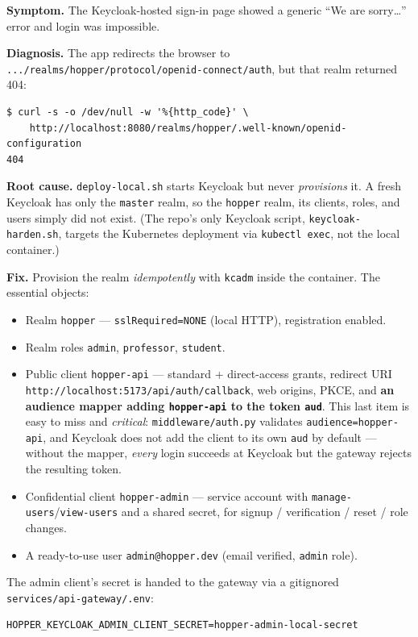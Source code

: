 \documentclass[11pt,a4paper]{article}
\newcommand{\code}[1]{\texttt{\small #1}}
\begin{document}
\textbf{Symptom.} The Keycloak-hosted sign-in page showed a generic
``We are sorry\dots'' error and login was impossible.

\textbf{Diagnosis.} The app redirects the browser to
\code{.../realms/hopper/protocol/openid-connect/auth}, but that realm returned
404:
\begin{lstlisting}
$ curl -s -o /dev/null -w '%{http_code}' \
    http://localhost:8080/realms/hopper/.well-known/openid-configuration
404
\end{lstlisting}

\textbf{Root cause.} \code{deploy-local.sh} starts Keycloak but never
\emph{provisions} it. A fresh Keycloak has only the \code{master} realm, so the
\code{hopper} realm, its clients, roles, and users simply did not exist. (The
repo's only Keycloak script, \code{keycloak-harden.sh}, targets the Kubernetes
deployment via \code{kubectl exec}, not the local container.)

\textbf{Fix.} Provision the realm \emph{idempotently} with \code{kcadm} inside the
container. The essential objects:

\begin{itemize}[nosep]
  \item Realm \code{hopper} --- \code{sslRequired=NONE} (local HTTP),
        registration enabled.
  \item Realm roles \code{admin}, \code{professor}, \code{student}.
  \item Public client \code{hopper-api} --- standard + direct-access grants,
        redirect URI \code{http://localhost:5173/api/auth/callback}, web origins,
        PKCE, and \textbf{an audience mapper adding \code{hopper-api} to the token
        \code{aud}}. This last item is easy to miss and \emph{critical}:
        \code{middleware/auth.py} validates \code{audience=hopper-api}, and
        Keycloak does not add the client to its own \code{aud} by default ---
        without the mapper, \emph{every} login succeeds at Keycloak but the
        gateway rejects the resulting token.
  \item Confidential client \code{hopper-admin} --- service account with
        \code{manage-users}/\code{view-users} and a shared secret, for
        signup / verification / reset / role changes.
  \item A ready-to-use user \code{admin@hopper.dev} (email verified, \code{admin}
        role).
\end{itemize}

\noindent
The admin client's secret is handed to the gateway via a gitignored
\code{services/api-gateway/.env}:
\begin{lstlisting}
HOPPER_KEYCLOAK_ADMIN_CLIENT_SECRET=hopper-admin-local-secret
\end{lstlisting}
\end{document}
